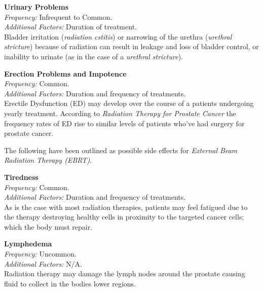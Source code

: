 \documentclass[journal]{vgtc}                %
\begin{document}
                        \textbf{Urinary Problems}
                        \\ \textit{Frequency:} Infrequent to Common.
                        \\ \textit{Additional Factors:} Duration of treatment.
                        \\ Bladder irritation (\textit{radiation cstitis}) or narrowing of the urethra (\textit{urethral stricture}) because of radiation can result in leakage and loss of bladder control, or inability to urinate (as in the case of a \textit{urethral stricture}). \cite{RadiationTherapy:2005}
                        \newline

                        \textbf{Erection Problems and Impotence}
                        \\ \textit{Frequency:} Common.
                        \\ \textit{Additional Factors:} Duration and frequency of treatments.
                        \\ Erectile Dysfunction (ED) may develop over the course of a patients undergoing yearly treatment. According to \textit{Radiation Therapy for Prostate Cancer} the frequency rates of ED rise to similar levels of patients who've had surgery for prostate cancer. \cite{RadiationTherapy:2005}
                        \newline

                        The following have been outlined as possible side effects for \textit{External Beam Radiation Therapy (EBRT)}.
                        \newline

                        \textbf{Tiredness}
                        \\ \textit{Frequency:} Common.
                        \\ \textit{Additional Factors:} Duration and frequency of treatments.
                        \\ As is the case with most radiation therapies, patients may feel fatigued due to the therapy destroying healthy cells in proximity to the targeted cancer cells; which the body must repair. \cite{RadiationTherapy:2005}
                        \newline

                        \textbf{Lymphedema}
                        \\ \textit{Frequency:} Uncommon.
                        \\ \textit{Additional Factors:} N/A.
                        \\ Radiation therapy may damage the lymph nodes around the prostate causing fluid to collect in the bodies lower regions. \cite{RadiationTherapy:2005}
                        \newline
\end{document}
